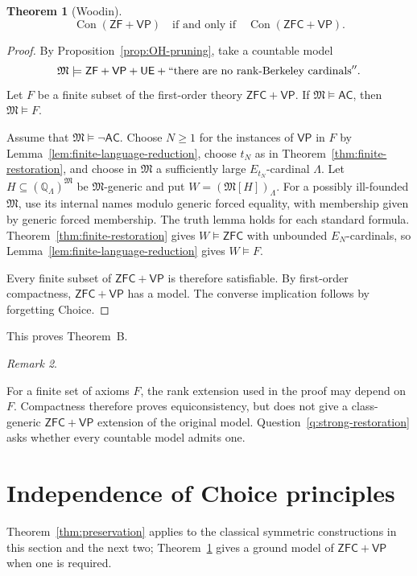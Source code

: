 \documentclass[11pt,a4paper]{amsart}
\DeclareRobustCommand{\revision}[1]{#1}
\newcommand{\VP}{\mathsf{VP}}
\newcommand{\AC}{\mathsf{AC}}
\newcommand{\ZF}{\mathsf{ZF}}
\newcommand{\ZFC}{\mathsf{ZFC}}
\newcommand{\Con}{\operatorname{Con}}
\newcommand{\UE}{\mathsf{UE}}
\theoremstyle{plain}
\newtheorem{theorem}{Theorem}[section]
\theoremstyle{definition}
\theoremstyle{remark}
\newtheorem{remark}[theorem]{Remark}
\begin{document}
\begin{theorem}[\revision{Woodin}]\label{thm:consistency-transfer}
\[
\Con(\ZF+\VP)\quad\text{if and only if}\quad\Con(\ZFC+\VP).
\]
\end{theorem}

\begin{proof}
By Proposition~\ref{prop:OH-pruning}, take a countable model
\[
\mathfrak M\models\ZF+\VP+\UE+``\text{there are no rank-Berkeley cardinals}''.
\]
Let $F$ be a finite subset of the first-order theory $\ZFC+\VP$.  If $\mathfrak M\models\AC$, then $\mathfrak M\models F$.

Assume that $\mathfrak M\models\neg\AC$.  Choose $N\geq1$ for the instances of $\VP$ in $F$ by Lemma~\ref{lem:finite-language-reduction}, choose $t_N$ as in Theorem~\ref{thm:finite-restoration}, and choose in $\mathfrak M$ a sufficiently large $E_{t_N}$-cardinal $\Lambda$.  Let $H\subseteq(\mathbb Q_\Lambda)^{\mathfrak M}$ be $\mathfrak M$-generic and put $W=(\mathfrak M[H])_\Lambda$.  For a possibly ill-founded $\mathfrak M$, use its internal names modulo generic forced equality, with membership given by generic forced membership.  The truth lemma holds for each standard formula.  Theorem~\ref{thm:finite-restoration} gives $W\models\ZFC$ with unbounded $E_N$-cardinals, so Lemma~\ref{lem:finite-language-reduction} gives $W\models F$.

Every finite subset of $\ZFC+\VP$ is therefore satisfiable.  By first-order compactness, $\ZFC+\VP$ has a model.  The converse implication follows by forgetting Choice.
\end{proof}

This proves Theorem~B.

\begin{remark}\label{rem:consistency-not-uniform}

For a finite set of axioms $F$, the rank extension used in the proof may depend on $F$.  Compactness therefore proves equiconsistency, but does not give a class-generic $\ZFC+\VP$ extension of the original model.  Question~\ref{q:strong-restoration} asks whether every countable model admits one.
\end{remark}
\endgroup

\section{{Independence of Choice principles}}

Theorem~\ref{thm:preservation} applies to the classical symmetric constructions in this section and the next two; Theorem~\ref{thm:consistency-transfer} gives a ground model of $\ZFC+\VP$ when one is required.
\end{document}
